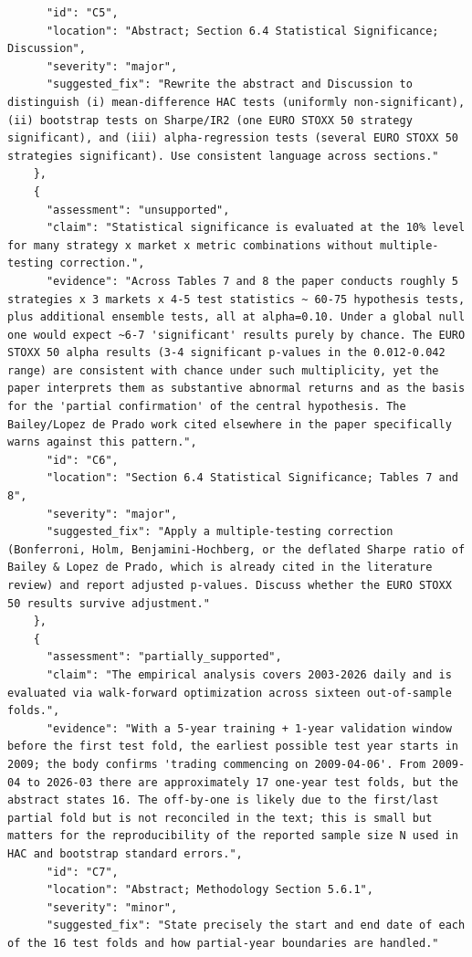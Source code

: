 \documentclass[11pt]{article}
\begin{document}
\begin{verbatim}
      "id": "C5",
      "location": "Abstract; Section 6.4 Statistical Significance; Discussion",
      "severity": "major",
      "suggested_fix": "Rewrite the abstract and Discussion to distinguish (i) mean-difference HAC tests (uniformly non-significant), (ii) bootstrap tests on Sharpe/IR2 (one EURO STOXX 50 strategy significant), and (iii) alpha-regression tests (several EURO STOXX 50 strategies significant). Use consistent language across sections."
    },
    {
      "assessment": "unsupported",
      "claim": "Statistical significance is evaluated at the 10% level for many strategy x market x metric combinations without multiple-testing correction.",
      "evidence": "Across Tables 7 and 8 the paper conducts roughly 5 strategies x 3 markets x 4-5 test statistics ~ 60-75 hypothesis tests, plus additional ensemble tests, all at alpha=0.10. Under a global null one would expect ~6-7 'significant' results purely by chance. The EURO STOXX 50 alpha results (3-4 significant p-values in the 0.012-0.042 range) are consistent with chance under such multiplicity, yet the paper interprets them as substantive abnormal returns and as the basis for the 'partial confirmation' of the central hypothesis. The Bailey/Lopez de Prado work cited elsewhere in the paper specifically warns against this pattern.",
      "id": "C6",
      "location": "Section 6.4 Statistical Significance; Tables 7 and 8",
      "severity": "major",
      "suggested_fix": "Apply a multiple-testing correction (Bonferroni, Holm, Benjamini-Hochberg, or the deflated Sharpe ratio of Bailey & Lopez de Prado, which is already cited in the literature review) and report adjusted p-values. Discuss whether the EURO STOXX 50 results survive adjustment."
    },
    {
      "assessment": "partially_supported",
      "claim": "The empirical analysis covers 2003-2026 daily and is evaluated via walk-forward optimization across sixteen out-of-sample folds.",
      "evidence": "With a 5-year training + 1-year validation window before the first test fold, the earliest possible test year starts in 2009; the body confirms 'trading commencing on 2009-04-06'. From 2009-04 to 2026-03 there are approximately 17 one-year test folds, but the abstract states 16. The off-by-one is likely due to the first/last partial fold but is not reconciled in the text; this is small but matters for the reproducibility of the reported sample size N used in HAC and bootstrap standard errors.",
      "id": "C7",
      "location": "Abstract; Methodology Section 5.6.1",
      "severity": "minor",
      "suggested_fix": "State precisely the start and end date of each of the 16 test folds and how partial-year boundaries are handled."

\end{verbatim}
\end{document}
